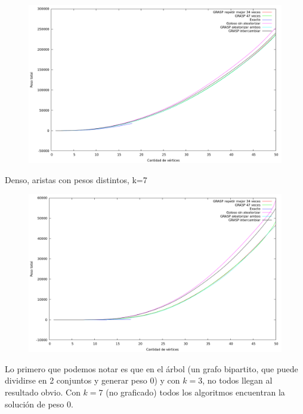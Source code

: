 \begin{figure}[H]
  \begin{center}
    \includegraphics[scale=0.35]{imagenes/ej6-denso-pesos-distintos-k3-peso.png}
  \end{center}
\end{figure}

Denso, aristas con pesos distintos, k=7

\begin{figure}[H]
  \begin{center}
    \includegraphics[scale=0.35]{imagenes/ej6-denso-pesos-distintos-k7-peso.png}
  \end{center}
\end{figure}

Lo primero que podemos notar es que en el árbol (un grafo bipartito, que puede
dividirse en 2 conjuntos y generar peso 0) y con $k = 3$, no todos llegan al
resultado obvio. Con $k = 7$ (no graficado) todos los algoritmos encuentran la
solución de peso 0.

